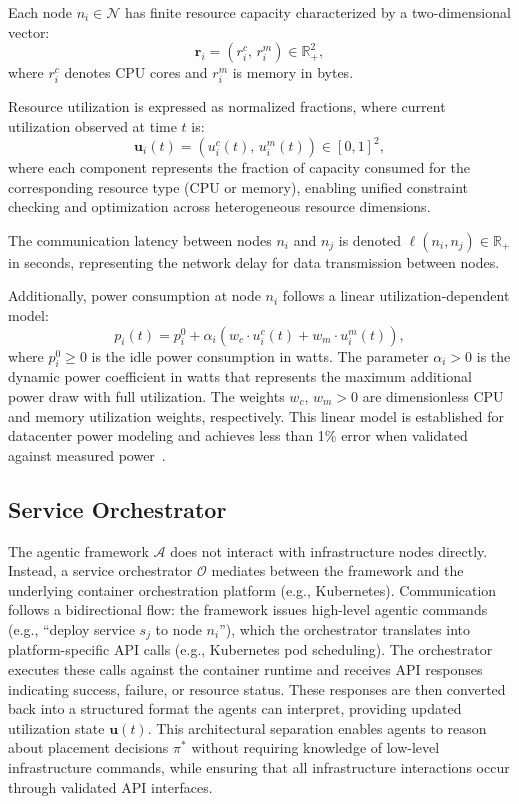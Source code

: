 Each node $n_i \in \mathcal{N}$ has finite resource capacity characterized by a two-dimensional vector:
\begin{equation}
\mathbf{r}_i = (r_i^c,\, r_i^m) \in \mathbb{R}_+^2,
\label{eq:ch5_capacity}
\end{equation}
where $r_i^c$ denotes \ac{CPU} cores and $r_i^m$ is memory in bytes.

Resource utilization is expressed as normalized fractions, where current utilization observed at time $t$ is:
\begin{equation}
\mathbf{u}_i(t) = (u_i^c(t),\, u_i^m(t)) \in [0,1]^2,
\label{eq:ch5_utilization}
\end{equation}
where each component represents the fraction of capacity consumed for the corresponding resource type (\ac{CPU} or memory), enabling unified constraint checking and optimization across heterogeneous resource dimensions.

The communication latency between nodes $n_i$ and $n_j$ is denoted $\ell(n_i, n_j) \in \mathbb{R}_+$ in seconds, representing the network delay for data transmission between nodes.

Additionally, power consumption at node $n_i$ follows a linear utilization-dependent model:
\begin{equation}
p_i(t) = p_i^0 + \alpha_i (w_c \cdot u_i^c(t) + w_m \cdot u_i^m(t)),
\label{eq:ch5_power}
\end{equation}
where $p_i^0 \geq 0$ is the idle power consumption in watts. The parameter $\alpha_i > 0$ is the dynamic power coefficient in watts that represents the maximum additional power draw with full utilization. The weights $w_c,\, w_m > 0$ are dimensionless \ac{CPU} and memory utilization weights, respectively. This linear model is established for datacenter power modeling and achieves less than 1\% error when validated against measured power~\cite{fan2007power}.

\subsection{Service Orchestrator}
\label{subsec:ch5_service_orchestrator}

The agentic framework $\mathcal{A}$ does not interact with infrastructure nodes directly. Instead, a service orchestrator $\mathcal{O}$ mediates between the framework and the underlying container orchestration platform (e.g., Kubernetes). Communication follows a bidirectional flow: the framework issues high-level agentic commands (e.g., ``deploy service $s_j$ to node $n_i$''), which the orchestrator translates into platform-specific \ac{API} calls (e.g., Kubernetes pod scheduling). The orchestrator executes these calls against the container runtime and receives \ac{API} responses indicating success, failure, or resource status. These responses are then converted back into a structured format the agents can interpret, providing updated utilization state $\mathbf{u}(t)$. This architectural separation enables agents to reason about placement decisions $\pi^*$ without requiring knowledge of low-level infrastructure commands, while ensuring that all infrastructure interactions occur through validated \ac{API} interfaces.

